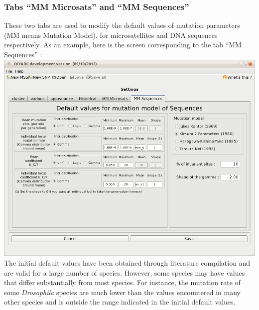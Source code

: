 \subsubsection{Tabs \textsf{``MM Microsats''} and \textsf{``MM Sequences''}}

These two tabs are used to modify the default values of mutation parameters (MM means Mutation Model), for microsatellites and DNA sequences respectively. As an example, here is the screen corresponding to the tab  \textsf{``MM Sequences''} : \\

\includegraphics[scale=0.33]{gui_pictures/Capture-DIYABC-102.png} \\

The initial default values have been obtained through literature compilation and are valid for a large number of species. However, some species may have values that differ substantially from most species. For instance, the mutation rate of some \emph{Drosophila} species are much lower than the values encountered in many other species \citep{SMA1997,VPAD2000} and is outside the range indicated in the initial default values. 



 
